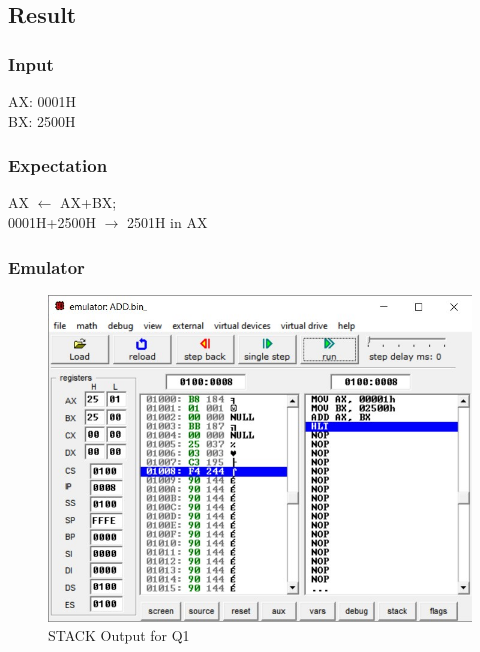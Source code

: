 \documentclass{article}
\begin{document}
\break
\subsection{Result}
\subsubsection{Input}
AX: 0001H \\
BX: 2500H \\

\subsubsection{Expectation}
AX $\leftarrow$ AX+BX; \\  
0001H+2500H $\rightarrow$ 2501H in AX \\


\subsubsection{Emulator}

\begin{figure}[h]
\begin{center}
\includegraphics[width=1.0\textwidth]{ADD} 
\caption{STACK Output for Q1}
\end{center}
\end{figure}
\end{document}
